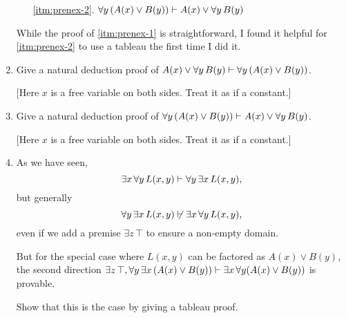 \documentclass{cs81-homework}
\begin{document}
\begin{enumerate}
\begin{enumerate}
  \item[\ref{itm:prenex-2}.]
    \(\forall y \, (A(x) \lor B(y)) \vdash A(x) \lor \forall y \, B(y)\)
  \end{enumerate}
  While the proof of \ref{itm:prenex-1} is straightforward, I found it helpful
  for \ref{itm:prenex-2} to use a tableau the first time I did it.

  \mbox{}

\item \label{itm:prenex-1}  Give a natural deduction proof of
  \(A(x) \lor \forall y \, B(y) \vdash \forall y \, (A(x) \lor B(y))\).

  [Here \(x\) is a free variable on both sides. Treat it as if a constant.]

  \begin{solution}
  \end{solution}

\item \label{itm:prenex-2}  Give a natural deduction proof of
  \(\forall y \, (A(x) \lor B(y)) \vdash A(x) \lor \forall y \, B(y)\).

  [Here \(x\) is a free variable on both sides. Treat it as if a constant.]

  \begin{solution}
  \end{solution}

\item {} As we have seen,
  \[
    \exists x \, \forall y \, L(x, y) \vdash \forall y \, \exists x \, L(x, y),
  \]
  but generally
  \[
    \forall y \, \exists x \, L(x, y) \not \vdash \exists x \, \forall y \,
    L(x, y),
  \]
  even if we add a premise \(\exists z \, \top\) to ensure a non-empty domain.

  But for the special case where \(L(x, y)\) can be factored as
  \(A(x) \lor B(y)\), the second direction
  \(\exists z \, \top, \forall y \, \exists x \, (A(x) \lor B(y)) \vdash
  \exists x \, \forall y (A(x) \lor B(y))\) is provable.

  Show that this is the case by giving a tableau proof.

  \begin{solution}
  \end{solution}


\end{enumerate}
\end{document}
